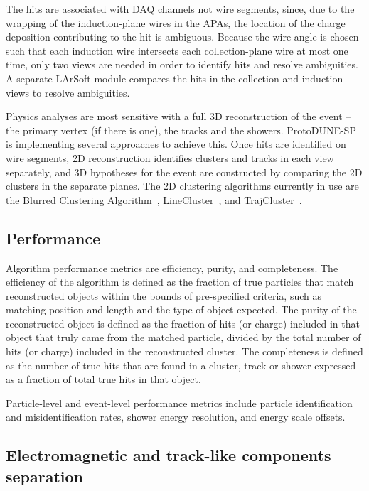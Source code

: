 The hits are associated with DAQ channels 
not wire segments, since, due to the wrapping of the induction-plane
wires in the APAs, the location of the %
charge deposition contributing to the hit is ambiguous. %
Because the wire angle
is chosen such that each induction wire intersects each collection-plane
wire at most one time, only two views are needed in order to identify
hits and resolve ambiguities.  A separate LArSoft module compares the
hits in the collection and induction views to
resolve ambiguities.  

Physics analyses are most sensitive with a full 3D reconstruction of the
event -- the primary vertex (if there is one), the tracks and the showers.
ProtoDUNE-SP is implementing several approaches to achieve this. Once hits are identified on wire
segments, 2D reconstruction identifies clusters and tracks
in each view separately, and 3D hypotheses for
the event are constructed by comparing the 2D clusters
in the separate planes.  The 2D clustering algorithms currently in
use are the Blurred Clustering Algorithm~\cite{blurredcluster},
LineCluster~\cite{linecluster}, and TrajCluster~\cite{trajcluster}.  

\subsection{Performance}

Algorithm performance metrics are efficiency, purity, and completeness.  The
efficiency of the algorithm is defined as the fraction of true particles that
match reconstructed objects within the bounds of pre-specified
criteria, such as matching position and length and the type of object
expected.  The purity of the reconstructed object is defined as the fraction of
hits (or charge) included in that object that truly came from the
matched particle, divided by the total number of hits (or charge)
included in the reconstructed cluster.  The completeness is defined as
the number of true hits that are found in a cluster, track or shower
expressed as a fraction of total true hits in that object.  

Particle-level and event-level performance metrics include particle identification
and misidentification rates, shower energy resolution, and energy scale offsets.


\subsection{Electromagnetic and track-like components separation}

